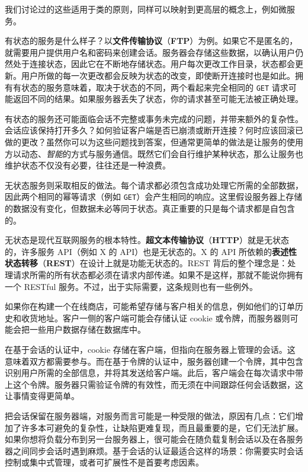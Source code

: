 我们讨论过的这些适用于类的原则，同样可以映射到更高层的概念上，例如微服务。

\label{idx:086}
有状态的服务是什么样子？以\textbf{文件传输协议}（\textbf{FTP}）为例。如果它不是匿名的，就需要用户提供用户名和密码来创建会话。服务器会存储这些数据，以确认用户仍然处于连接状态，因此它在不断地存储状态。用户每次更改工作目录，状态都会更新。用户所做的每一次更改都会反映为状态的改变，即使断开连接时也是如此。拥有有状态的服务意味着，取决于状态的不同，两个看起来完全相同的 \texttt{GET} 请求可能返回不同的结果。如果服务器丢失了状态，你的请求甚至可能无法被正确处理。

有状态的服务还可能面临会话不完整或事务未完成的问题，并带来额外的复杂性。会话应该保持打开多久？如何验证客户端是否已崩溃或断开连接？何时应该回滚已做的更改？虽然你可以为这些问题找到答案，但通常更简单的做法是让服务的使用方以动态、\emph{智能}的方式与服务通信。既然它们会自行维护某种状态，那么让服务也维护状态不仅没有必要，往往还是一种浪费。

\label{idx:087}
无状态服务则采取相反的做法。每个请求都必须包含成功处理它所需的全部数据，因此两个相同的幂等请求（例如 \texttt{GET}）会产生相同的响应。这里假设服务器上存储的数据没有变化，但数据未必等同于状态。真正重要的只是每个请求都是自包含的。

\label{idx:088}
无状态是现代互联网服务的根本特性。\textbf{超文本传输协议}（\textbf{HTTP}）就是无状态的，许多服务 API（例如 X 的 API）也是无状态的。X 的 API 所依赖的\textbf{表述性状态转移}（\textbf{REST}）在设计上就是功能无状态的。REST 背后的整个理念是：处理请求所需的所有状态都必须在请求内部传递。如果不是这样，那就不能说你拥有一个 RESTful 服务。不过，出于实际需要，这条规则也有一些例外。

如果你在构建一个在线商店，可能希望存储与客户相关的信息，例如他们的订单历史和收货地址。客户一侧的客户端可能会存储认证 cookie 或令牌，而服务器则可能会把一些用户数据存储在数据库中。

在基于会话的认证中，cookie 存储在客户端，但指向在服务器上管理的会话。这意味着双方都需要参与。而在基于令牌的认证中，服务器创建一个令牌，其中包含识别用户所需的全部信息，并将其发送给客户端。此后，客户端会在每次请求中带上这个令牌。服务器只需验证令牌的有效性，而无须在中间跟踪任何会话数据，这让事情变得更简单。

把会话保留在服务器端，对服务而言可能是一种受限的做法，原因有几点：它们增加了许多本可避免的复杂性，让缺陷更难复现，而且最重要的是，它们无法扩展。如果你想将负载分布到另一台服务器上，很可能会在随负载复制会话以及在各服务器之间同步会话时遇到麻烦。基于会话的认证最适合这样的场景：你需要实时会话控制或集中式管理，或者可扩展性不是首要考虑因素。

